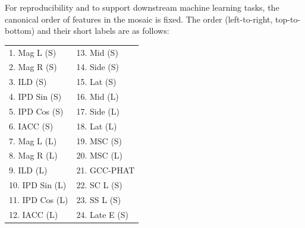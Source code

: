 \documentclass[12pt, a4paper]{article}
\begin{document}
For reproducibility and to support downstream machine learning tasks, the canonical order of features in the mosaic is fixed. The order (left-to-right, top-to-bottom) and their short labels are as follows:
\begin{center}
\begin{tabular}{ll}
1. Mag L (S) & 13. Mid (S) \\
2. Mag R (S) & 14. Side (S) \\
3. ILD (S) & 15. Lat (S) \\
4. IPD Sin (S) & 16. Mid (L) \\
5. IPD Cos (S) & 17. Side (L) \\
6. IACC (S) & 18. Lat (L) \\
7. Mag L (L) & 19. MSC (S) \\
8. Mag R (L) & 20. MSC (L) \\
9. ILD (L) & 21. GCC-PHAT \\
10. IPD Sin (L) & 22. SC L (S) \\
11. IPD Cos (L) & 23. SS L (S) \\
12. IACC (L) & 24. Late E (S) \\
\end{tabular}
\end{center}
\end{document}
